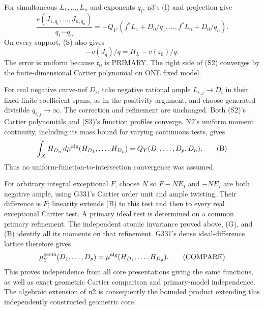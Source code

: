 For simultaneous \(L_1,\ldots,L_n\) and exponents \(q_i\), n3's (I) and projection give
\[
\frac{e(J_{1,q_1},\ldots,J_{n,q_n})}{q_1\cdots q_n}
=-Q_{Y'}(f^*L_1+D_0/q_1,\ldots,f^*L_n+D_0/q_n). \tag{S2}
\]
On every support, (S) also gives
\[
-v(J_q)/q=H_L-v(\mathfrak c_0)/q. \tag{S3}
\]
The error is uniform because \(\mathfrak c_0\) is PRIMARY. The right side of (S2) converges by the finite-dimensional Cartier polynomial on ONE fixed model.

For real negative curve-nef \(D_i\), take negative rational ample \(L_{i,j}\to D_i\) in their fixed finite coefficient spans, as in the positivity argument, and choose generated divisible \(q_{i,j}\to\infty\). The correction and refinement are unchanged. Both (S2)'s Cartier polynomials and (S3)'s function profiles converge. N2's uniform moment continuity, including its mass bound for varying continuous tests, gives
\[
\int_X H_{D_n}\,d\mu^{\rm alg}(H_{D_1},\ldots,H_{D_p})
=Q_Y(D_1,\ldots,D_p,D_n). \tag{B}
\]
Thus no uniform-function-to-intersection convergence was assumed.

For arbitrary integral exceptional \(F\), choose \(N\) so \(F-NE_I\) and \(-NE_I\) are both negative ample, using G331's Cartier order unit and ample twisting. Their difference is \(F\); linearity extends (B) to this test and then to every real exceptional Cartier test. A primary ideal test is determined on a common primary refinement. The independent atomic invariance proved above, (G), and (B) identify all its moments on that refinement. G331's dense ideal-difference lattice therefore gives
\[
\mu_Y^{\rm geom}(D_1,\ldots,D_p)
=\mu^{\rm alg}(H_{D_1},\ldots,H_{D_p}). \tag{COMPARE}
\]
This proves independence from all core presentations giving the same functions, as well as exact geometric Cartier comparison and primary-model independence. The algebraic extension of n2 is consequently the bounded product extending this independently constructed geometric core.
